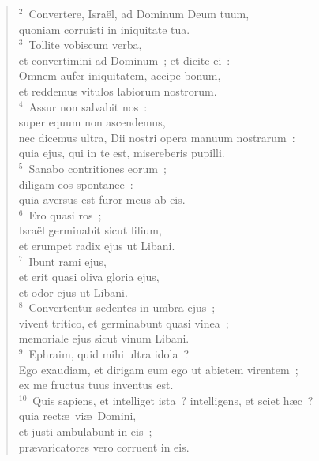 \begin{verse}\vspace{6pt}${}^{2}$~Convertere, Isra\"el, ad Dominum Deum tuum,\\ quoniam corruisti in iniquitate tua.\\
${}^{3}$~Tollite vobiscum verba,\\ et convertimini ad Dominum~; et dicite ei~:\\ Omnem aufer iniquitatem, accipe bonum,\\ et reddemus vitulos labiorum nostrorum.\\
${}^{4}$~Assur non salvabit nos~:\\ super equum non ascendemus,\\ nec dicemus ultra, Dii nostri opera manuum nostrarum~:\\ quia ejus, qui in te est, misereberis pupilli.\\
${}^{5}$~Sanabo contritiones eorum~;\\ diligam eos spontanee~:\\ quia aversus est furor meus ab eis.\\
${}^{6}$~Ero quasi ros~;\\ Isra\"el germinabit sicut lilium,\\ et erumpet radix ejus ut Libani.\\
${}^{7}$~Ibunt rami ejus,\\ et erit quasi oliva gloria ejus,\\ et odor ejus ut Libani.\\
${}^{8}$~Convertentur sedentes in umbra ejus~;\\ vivent tritico, et germinabunt quasi vinea~;\\ memoriale ejus sicut vinum Libani.\\
${}^{9}$~Ephraim, quid mihi ultra idola~?\\ Ego exaudiam, et dirigam eum ego ut abietem virentem~;\\ ex me fructus tuus inventus est.\\
${}^{10}$~Quis sapiens, et intelliget ista~? intelligens, et sciet h\ae c~?\\ quia rect\ae\ vi\ae\ Domini,\\ et justi ambulabunt in eis~;\\ pr\ae varicatores vero corruent in eis.\end{verse}


